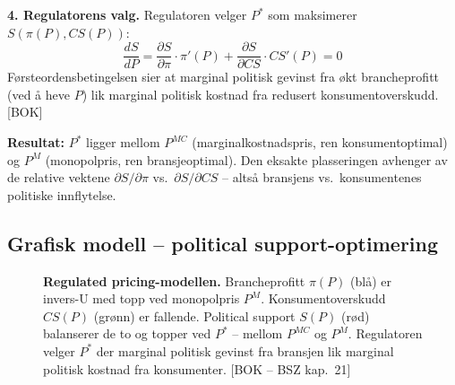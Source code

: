 \textbf{4. Regulatorens valg.} Regulatoren velger $P^{*}$ som maksimerer $S(\pi(P), CS(P))$:
\[
\frac{dS}{dP} = \frac{\partial S}{\partial \pi}\cdot\pi'(P) + \frac{\partial S}{\partial CS}\cdot CS'(P) = 0
\]
Førsteordensbetingelsen sier at marginal politisk gevinst fra økt brancheprofitt (ved å heve $P$) lik marginal politisk kostnad fra redusert konsumentoverskudd. [BOK]

\textbf{Resultat:} $P^{*}$ ligger mellom $P^{MC}$ (marginal\-kostnadspris, ren konsumentoptimal) og $P^{M}$ (monopolpris, ren bransjeoptimal). Den eksakte plasseringen avhenger av de relative vektene $\partial S/\partial \pi$ vs.\ $\partial S/\partial CS$ -- altså bransjens vs.\ konsumentenes politiske innflytelse.

\subsection*{Grafisk modell -- political support-optimering}

\begin{figure}[H]
\centering
{}
\caption{\textbf{Regulated pricing-modellen.} Brancheprofitt $\pi(P)$ (blå) er invers-U med topp ved monopolpris $P^M$. Konsumentoverskudd $CS(P)$ (grønn) er fallende. Political support $S(P)$ (rød) balanserer de to og topper ved $P^*$ -- mellom $P^{MC}$ og $P^M$. Regulatoren velger $P^*$ der marginal politisk gevinst fra bransjen lik marginal politisk kostnad fra konsumenter. [BOK -- BSZ kap.\ 21]}
\end{figure}

